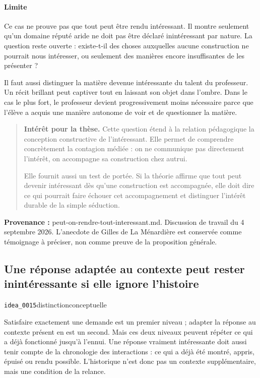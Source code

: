 \documentclass[10pt,a4paper]{article}
\begin{document}
\paragraph{Limite}
Ce cas ne prouve pas que tout peut être rendu intéressant. Il montre seulement qu'un domaine réputé aride ne doit pas être déclaré inintéressant par nature. La question reste ouverte : existe-t-il des choses auxquelles aucune construction ne pourrait nous intéresser, ou seulement des manières encore insuffisantes de les présenter ?

Il faut aussi distinguer la matière devenue intéressante du talent du professeur. Un récit brillant peut captiver tout en laissant son objet dans l'ombre. Dans le cas le plus fort, le professeur devient progressivement moins nécessaire parce que l'élève a acquis une manière autonome de voir et de questionner la matière.

\begin{quote}
\textbf{Intérêt pour la thèse.} Cette question étend à la relation pédagogique la conception constructive de l'intéressant. Elle permet de comprendre concrètement la contagion médiée : on ne communique pas directement l'intérêt, on accompagne sa construction chez autrui.

Elle fournit aussi un test de portée. Si la théorie affirme que tout peut devenir intéressant dès qu'une construction est accompagnée, elle doit dire ce qui pourrait faire échouer cet accompagnement et distinguer l'intérêt durable de la simple séduction.
\end{quote}
{\footnotesize\color{metadata}\textbf{Provenance :} peut-on-rendre-tout-interessant.md. Discussion de travail du 4 septembre 2026. L'anecdote de Gilles de La Ménardière est conservée comme témoignage à préciser, non comme preuve de la proposition générale.\par}

\subsection{Une réponse adaptée au contexte peut rester inintéressante si elle ignore l'histoire}
{\small\color{metadata} \texttt{idea\_0015}\quad\textbullet\quad distinction\quad\textbullet\quad conceptuelle\par}

Satisfaire exactement une demande est un premier niveau ; adapter la réponse au contexte présent en est un second. Mais ces deux niveaux peuvent répéter ce qui a déjà fonctionné jusqu'à l'ennui. Une réponse vraiment intéressante doit aussi tenir compte de la chronologie des interactions : ce qui a déjà été montré, appris, épuisé ou rendu possible. L'historique n'est donc pas un contexte supplémentaire, mais une condition de la relance.
\end{document}
